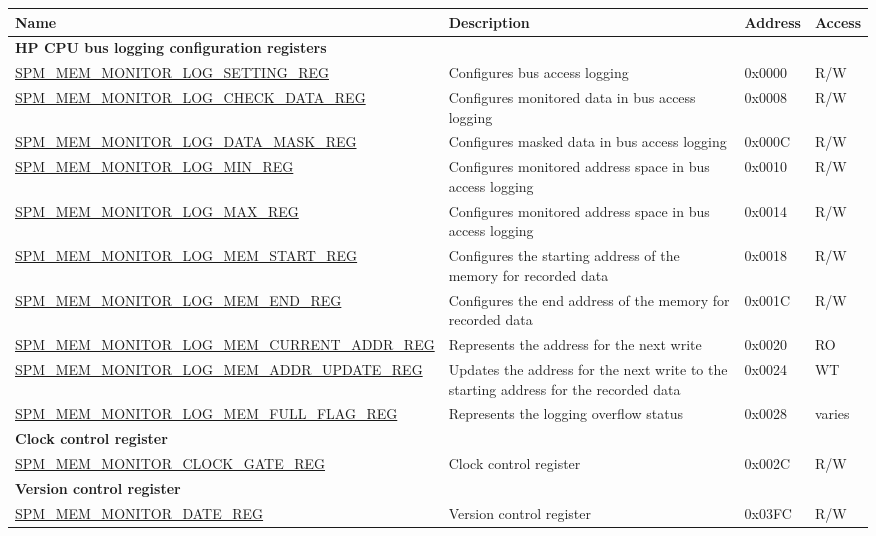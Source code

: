 \begin{longtable}{ | p{8.7cm} | m{5.3cm} | p{1.2cm} | p{1.2cm} | }
\hline\rowcolor{lightgray}
{\bfseries Name} & {\bfseries Description} &  {\bfseries Address} & {\bfseries Access} \\ \hline
\endhead
\multicolumn{4}{|l|}{\textbf{HP CPU bus logging configuration registers}} \\ \hline
\hyperref[regdesc:SPMMEMMONITORLOGSETTINGREG]{SPM\_MEM\_MONITOR\_LOG\_SETTING\_REG} & Configures bus access logging & 0x0000 & R/W \\ \hline
\hyperref[regdesc:SPMMEMMONITORLOGCHECKDATAREG]{SPM\_MEM\_MONITOR\_LOG\_CHECK\_DATA\_REG} & Configures monitored data in bus access logging & 0x0008 & R/W \\ \hline
\hyperref[regdesc:SPMMEMMONITORLOGDATAMASKREG]{SPM\_MEM\_MONITOR\_LOG\_DATA\_MASK\_REG} & Configures masked data in bus access logging & 0x000C & R/W \\ \hline
\hyperref[regdesc:SPMMEMMONITORLOGMINREG]{SPM\_MEM\_MONITOR\_LOG\_MIN\_REG} & Configures monitored address space in bus access logging & 0x0010 & R/W \\ \hline
\hyperref[regdesc:SPMMEMMONITORLOGMAXREG]{SPM\_MEM\_MONITOR\_LOG\_MAX\_REG} & Configures monitored address space in bus access logging & 0x0014 & R/W \\ \hline
\hyperref[regdesc:SPMMEMMONITORLOGMEMSTARTREG]{SPM\_MEM\_MONITOR\_LOG\_MEM\_START\_REG} & Configures the starting address of the memory for recorded data & 0x0018 & R/W \\ \hline
\hyperref[regdesc:SPMMEMMONITORLOGMEMENDREG]{SPM\_MEM\_MONITOR\_LOG\_MEM\_END\_REG} & Configures the end address of the memory for recorded data & 0x001C & R/W \\ \hline
\hyperref[regdesc:SPMMEMMONITORLOGMEMCURRENTADDRREG]{SPM\_MEM\_MONITOR\_LOG\_MEM\_CURRENT\_\newline ADDR\_REG} & Represents the address for the next write & 0x0020 & RO \\ \hline
\hyperref[regdesc:SPMMEMMONITORLOGMEMADDRUPDATEREG]{SPM\_MEM\_MONITOR\_LOG\_MEM\_ADDR\_UPDATE\_REG} & Updates the address for the next write to the starting address for the recorded data & 0x0024 & WT \\ \hline
\hyperref[regdesc:SPMMEMMONITORLOGMEMFULLFLAGREG]{SPM\_MEM\_MONITOR\_LOG\_MEM\_FULL\_FLAG\_REG} & Represents the logging overflow status & 0x0028 & varies \\ \hline
\multicolumn{4}{|l|}{\textbf{Clock control register}} \\ \hline
\hyperref[regdesc:SPMMEMMONITORCLOCKGATEREG]{SPM\_MEM\_MONITOR\_CLOCK\_GATE\_REG} & Clock control register & 0x002C & R/W \\ \hline
\multicolumn{4}{|l|}{\textbf{Version control register}} \\ \hline
\hyperref[regdesc:SPMMEMMONITORDATEREG]{SPM\_MEM\_MONITOR\_DATE\_REG} & Version control register & 0x03FC & R/W \\ \hline
\end{longtable}
